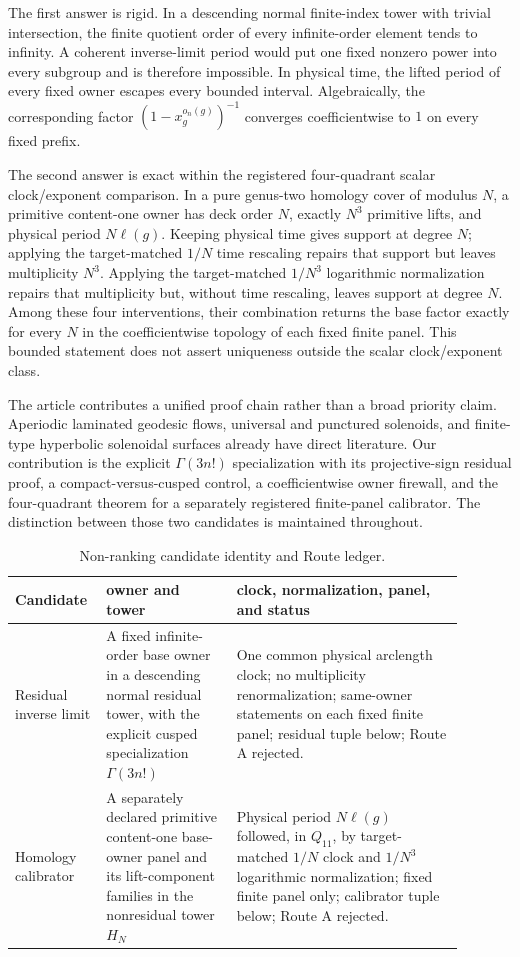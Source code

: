 \documentclass[11pt]{article}
\theoremstyle{definition}
\theoremstyle{remark}
\begin{document}
The first answer is rigid. In a descending normal finite-index tower with trivial intersection, the finite quotient order of every infinite-order element tends to infinity. A coherent inverse-limit period would put one fixed nonzero power into every subgroup and is therefore impossible. In physical time, the lifted period of every fixed owner escapes every bounded interval. Algebraically, the corresponding factor $(1-x_g^{o_n(g)})^{-1}$ converges coefficientwise to $1$ on every fixed prefix.

The second answer is exact within the registered four-quadrant scalar clock/exponent comparison. In a pure genus-two homology cover of modulus $N$, a primitive content-one owner has deck order $N$, exactly $N^3$ primitive lifts, and physical period $N\ell(g)$. Keeping physical time gives support at degree $N$; applying the target-matched $1/N$ time rescaling repairs that support but leaves multiplicity $N^3$. Applying the target-matched $1/N^3$ logarithmic normalization repairs that multiplicity but, without time rescaling, leaves support at degree $N$. Among these four interventions, their combination returns the base factor exactly for every $N$ in the coefficientwise topology of each fixed finite panel. This bounded statement does not assert uniqueness outside the scalar clock/exponent class.

The article contributes a unified proof chain rather than a broad priority claim. Aperiodic laminated geodesic flows, universal and punctured solenoids, and finite-type hyperbolic solenoidal surfaces already have direct literature. Our contribution is the explicit $\Gamma(3n!)$ specialization with its projective-sign residual proof, a compact-versus-cusped control, a coefficientwise owner firewall, and the four-quadrant theorem for a separately registered finite-panel calibrator. The distinction between those two candidates is maintained throughout.

\begin{table}[ht]
\centering
\small
\caption{Non-ranking candidate identity and Route ledger.}
\label{tab:candidate-route-map}
\begin{tabular}{p{0.15\linewidth}p{0.27\linewidth}p{0.47\linewidth}}
\toprule
Candidate & owner and tower & clock, normalization, panel, and status \\
\midrule
Residual inverse limit & A fixed infinite-order base owner in a descending normal residual tower, with the explicit cusped specialization $\Gamma(3n!)$ & One common physical arclength clock; no multiplicity renormalization; same-owner statements on each fixed finite panel; residual tuple below; Route A rejected. \\
Homology calibrator & A separately declared primitive content-one base-owner panel and its lift-component families in the nonresidual tower $H_N$ & Physical period $N\ell(g)$ followed, in $Q_{11}$, by target-matched $1/N$ clock and $1/N^3$ logarithmic normalization; fixed finite panel only; calibrator tuple below; Route A rejected. \\
\bottomrule
\end{tabular}
\end{table}
\end{document}
